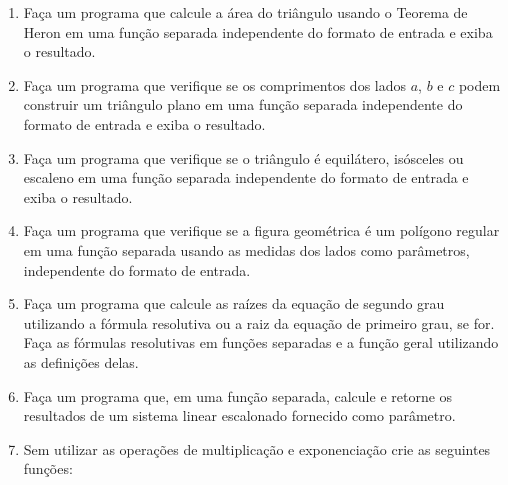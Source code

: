 \begin{enumerate}
	\begin{equation*}
		\sqrt[s]{\sum_{i=1}^d|A_i - B_i|^s}
	\end{equation*}
	
	dado um parâmetro $s$ fixado.
	
	Altere os programas da distância euclidiana e da distância de Manhattan para utilizarem essa função ao invés de definições próprias.


	\item Faça um programa que calcule a área do triângulo usando o Teorema de Heron em uma função separada independente do formato de entrada e exiba o resultado.
	

	\item Faça um programa que verifique se os comprimentos dos lados $a$, $b$ e $c$ podem construir um triângulo plano em uma função separada independente do formato de entrada e exiba o resultado.	
	

	\item Faça um programa que verifique se o triângulo é equilátero, isósceles ou escaleno em uma função separada independente do formato de entrada e exiba o resultado.
	

	\item Faça um programa que verifique se a figura geométrica é um polígono regular em uma função separada usando as medidas dos lados como parâmetros, independente do formato de entrada. 


	\item Faça um programa que calcule as raízes da equação de segundo grau utilizando a fórmula resolutiva ou a raiz da equação de primeiro grau, se for.
	Faça as fórmulas resolutivas em funções separadas e a função geral utilizando as definições delas.
	


	\item Faça um programa que, em uma função separada, calcule e retorne os resultados de um sistema linear escalonado fornecido como parâmetro.
	
	\quebra
	
	\item Sem utilizar as operações de multiplicação e exponenciação crie as seguintes funções:
	

\end{enumerate}
